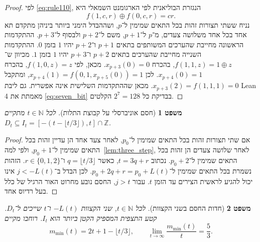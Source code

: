 \documentclass[11pt,a4paper]{article}
\DeclareRobustCommand{\textenglish}[1]{\foreignlanguage{english}{#1}}
\newtheorem{theorem}{משפט}[section]
\begin{document}
\begin{proof}
לפי \eqref{eq:rule110}, הנגזרת הבוליאנית לפי הארגומנט השמאלי היא
\begin{equation}\label{eq:bool_deriv}
f(1, c, r) \oplus f(0, c, r) = cr.
\end{equation}
נניח ששתי תצורות זהות בכל התאים שמימין ל־$p$, ושההבדל הימני ביותר ביניהן מתקדם תא אחד בכל אחד משלושה צעדים, מ־$p$ ל־$p+1$, משם ל־$p+2$ ולבסוף ל־$p+3$. ההתקדמות הראשונה מחייבת שהערכים המשותפים בתאים $p+1$ ו־$p+2$ יהיו $1$ בזמן $0$. ההתקדמות השנייה מחייבת שהערכים בתאים $p+2$ ו־$p+3$ יהיו $1$ בזמן $1$. מכיוון ש־$f(1, 1, z) = 1 \oplus z$, בהכרח $x_{p+3}(0) = 0$. מכאן, לפי $f(1, 0, z) = z$, בהכרח $x_{p+4}(0) = 1$. לכן $x_{p+4}(1) = f(0, 1, x_{p+5}(0)) = 1$, ומתקבל $x_{p+3}(2) = f(1, 1, 1) = 0$. מכאן שההתקדמות השלישית אינה אפשרית. גם ליבת \textenglish{Lean 4} מאמתת את \eqref{eq:seven_bit} בבדיקת כל $2^7 = 128$ הקלטים.
\end{proof}

\begin{theorem}[חסם אוניברסלי על קבוצת התלות]\label{thm:upper_bound}
לכל $t \in \mathbb{N}$ מתקיים $D_t \subseteq I_t = [-(t - \lfloor t/3 \rfloor), t] \cap \mathbb{Z}$.
\end{theorem}

\begin{proof}
אם שתי תצורות זהות בכל התאים שמימין ל־$p_0$, לאחר צעד אחד הן עדיין זהות בכל התאים שמימין ל־$p_0 + 1$, ולפי למה~\ref{lem:three_step}, לאחר שלושה צעדים הן זהות בכל התאים שמימין ל־$p_0 + 2$. נכתוב $t = 3q + r$, כאשר $q = \lfloor t/3 \rfloor$ ו־$r \in \{0, 1, 2\}$. הזהות נשמרת בכל התאים שמימין ל־$p_0 + 2q + r = p_0 + L(t)$. לכן הבדל ב־$j < -L(t)$ אינו יכול להגיע לראשית הצירים עד הזמן $t$. עבור $j > t$, החסם נובע מחרוט האור הרגיל של כלל בעל רדיוס אחד.
\end{proof}

\begin{theorem}[חדות החסם בשני הקצוות]\label{thm:sharpness}
לכל $t \in \mathbb{N}$, שני הקצוות $-L(t)$ ו־$t$ שייכים ל־$D_t$. קטע התצפית המספיק הקטן ביותר הוא $I_t$. רוחבו מקיים
\begin{equation}
m_{\min}(t) = 2t + 1 - \lfloor t/3 \rfloor, \qquad \lim_{t \to \infty} \frac{m_{\min}(t)}{t} = \frac{5}{3}.
\end{equation}
\end{theorem}
\end{document}
